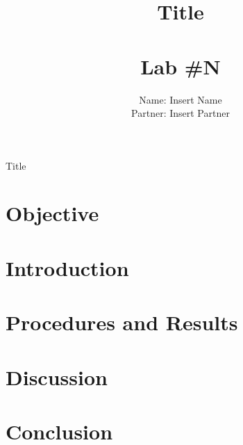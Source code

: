 \documentclass[11pt, titlepage]{article}
\title{Title \\ \ \\ \large Lab \#N}
\author{Name: Insert Name \\ Partner: Insert Partner}
\date{}
\begin{document}
\maketitle

\begin{center}
\LARGE Title
\end{center}

\section*{Objective}

\section*{Introduction}

\section*{Procedures and Results}

\section*{Discussion}

\section*{Conclusion}
\end{document}
